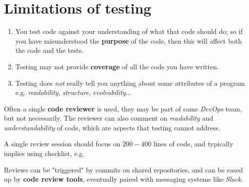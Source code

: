 \section{Limitations of testing}
\begin{enumerate}
   \item You test code against your understanding of what that code
   should do;
   so if you have misunderstood the \textbf{purpose} of the code,
   then this will affect both the code and the tests.
   \item Testing may not provide \textbf{coverage} of all the code you have
   written. 
   \item Testing does \textit{not} really tell you anything about some attributes
   of a program e.g. \textit{readability}, \textit{structure}, \textit{evolvability}...
\end{enumerate}

Often a single \textbf{code reviewer} is used, 
they may be part of same \textit{DevOps} team, but not necessarily.
The reviewer can also comment on \textit{readability} and \textit{understandability} of code, which are aspects that testing cannot address.

A single review session should focus on $200-400$ lines of code, and typically implies using checklist, e.g.

Reviews can be "triggered" by commits on shared repositories, and can be eased up by
\textbf{code review tools}, eventually paired with messaging systems like \textit{Slack}.

